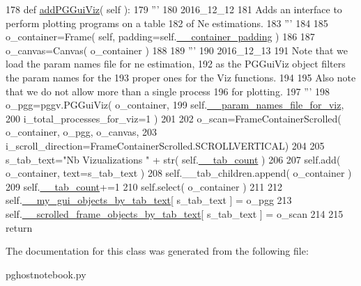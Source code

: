 \begin{DoxyCode}
178     \textcolor{keyword}{def }\hyperlink{classnegui_1_1pghostnotebook_1_1PGHostNotebook_a66dd928f1054bd004cb21010183b1fd9}{addPGGuiViz}( self ):
179         \textcolor{stringliteral}{'''}
180 \textcolor{stringliteral}{        2016\_12\_12}
181 \textcolor{stringliteral}{        Adds an interface to perform plotting programs on a table }
182 \textcolor{stringliteral}{        of Ne estimations.}
183 \textcolor{stringliteral}{        '''}
184         
185         o\_container=Frame( self, padding=self.\hyperlink{classnegui_1_1pghostnotebook_1_1PGHostNotebook_a790570fc06951c4ccc142a26c01668ef}{\_\_container\_padding} )
186 
187         o\_canvas=Canvas( o\_container )
188 
189         \textcolor{stringliteral}{'''}
190 \textcolor{stringliteral}{        2016\_12\_13}
191 \textcolor{stringliteral}{        Note that we load the param names file for ne estimation,}
192 \textcolor{stringliteral}{        as the PGGuiViz object filters the param names for the}
193 \textcolor{stringliteral}{        proper ones for the Viz functions.}
194 \textcolor{stringliteral}{}
195 \textcolor{stringliteral}{        Also note that we do not allow more than a single process}
196 \textcolor{stringliteral}{        for plotting.}
197 \textcolor{stringliteral}{        '''}
198         o\_pgg=pggv.PGGuiViz( o\_container, 
199                         self.\hyperlink{classnegui_1_1pghostnotebook_1_1PGHostNotebook_ace33b52316ef64f62d42c956fb785c76}{\_\_param\_names\_file\_for\_viz},
200                         i\_total\_processes\_for\_viz=1 )
201 
202         o\_scan=FrameContainerScrolled( o\_container, o\_pgg, o\_canvas, 
203         i\_scroll\_direction=FrameContainerScrolled.SCROLLVERTICAL)
204 
205         s\_tab\_text=\textcolor{stringliteral}{"Nb Vizualizations "} + str( self.\hyperlink{classnegui_1_1pghostnotebook_1_1PGHostNotebook_a84a7417cc57500cbe5c230449ba464b3}{\_\_tab\_count} )
206 
207         self.add( o\_container, text=s\_tab\_text )
208         self.\_\_tab\_children.append( o\_container )
209         self.\hyperlink{classnegui_1_1pghostnotebook_1_1PGHostNotebook_a84a7417cc57500cbe5c230449ba464b3}{\_\_tab\_count}+=1
210         self.select( o\_container )
211 
212         self.\hyperlink{classnegui_1_1pghostnotebook_1_1PGHostNotebook_af4966fb6fc80c08cd38bf21b2c723364}{\_\_my\_gui\_objects\_by\_tab\_text}[ s\_tab\_text ] = o\_pgg 
213         self.\hyperlink{classnegui_1_1pghostnotebook_1_1PGHostNotebook_a5f9ed267b317c56e1da89ef894a2b52a}{\_\_scrolled\_frame\_objects\_by\_tab\_text}[ s\_tab\_text ] = 
      o\_scan
214 
215         \textcolor{keywordflow}{return}
\end{DoxyCode}


The documentation for this class was generated from the following file\+:\begin{DoxyCompactItemize}
\item 
pghostnotebook.\+py\end{DoxyCompactItemize}
